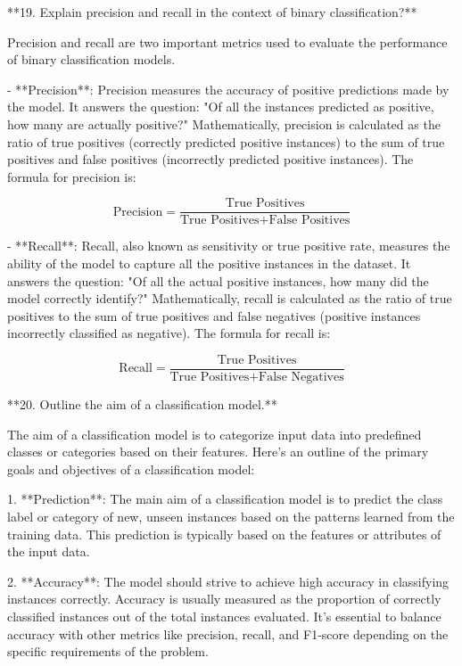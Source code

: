 **19. Explain precision and recall in the context of binary classification?**

Precision and recall are two important metrics used to evaluate the performance of binary classification models.

- **Precision**: Precision measures the accuracy of positive predictions made by the model. It answers the question: "Of all the instances predicted as positive, how many are actually positive?" Mathematically, precision is calculated as the ratio of true positives (correctly predicted positive instances) to the sum of true positives and false positives (incorrectly predicted positive instances). The formula for precision is:
  

\[ \text{Precision} = \frac{\text{True Positives}}{\text{True Positives} + \text{False Positives}} \]




- **Recall**: Recall, also known as sensitivity or true positive rate, measures the ability of the model to capture all the positive instances in the dataset. It answers the question: "Of all the actual positive instances, how many did the model correctly identify?" Mathematically, recall is calculated as the ratio of true positives to the sum of true positives and false negatives (positive instances incorrectly classified as negative). The formula for recall is:

  \[ \text{Recall} = \frac{\text{True Positives}}{\text{True Positives} + \text{False Negatives}} \]

**20. Outline the aim of a classification model.**

The aim of a classification model is to categorize input data into predefined classes or categories based on their features. Here's an outline of the primary goals and objectives of a classification model:

1. **Prediction**: The main aim of a classification model is to predict the class label or category of new, unseen instances based on the patterns learned from the training data. This prediction is typically based on the features or attributes of the input data.

2. **Accuracy**: The model should strive to achieve high accuracy in classifying instances correctly. Accuracy is usually measured as the proportion of correctly classified instances out of the total instances evaluated. It's essential to balance accuracy with other metrics like precision, recall, and F1-score depending on the specific requirements of the problem.

